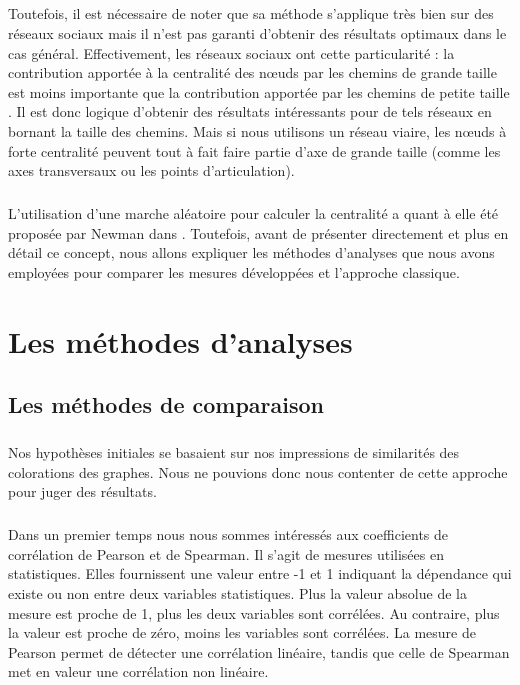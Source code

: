 \documentclass[a4paper, 10pt]{report}
\begin{document}
\paragraph{}Toutefois, il est nécessaire de noter que sa méthode s'applique très bien sur des réseaux sociaux mais il n'est pas garanti d'obtenir des résultats optimaux dans le cas général. Effectivement, les réseaux sociaux ont cette particularité : la contribution apportée à la centralité des n\oe uds par les chemins de grande taille est moins importante que la contribution apportée par les chemins de petite taille \cite{Friedkin1983Horizons, Alahakoon2011KPath}. Il est donc logique d'obtenir des résultats intéressants pour de tels réseaux en bornant la taille des chemins. Mais si nous utilisons un réseau viaire, les n\oe uds à forte centralité peuvent tout à fait faire partie d'axe de grande taille (comme les axes transversaux ou les points d'articulation).

\paragraph{}L'utilisation d'une marche aléatoire pour calculer la centralité a quant à elle été proposée par Newman dans \cite{Newman2005MeasureBetweenness}. Toutefois, avant de présenter directement et plus en détail ce concept, nous allons expliquer les méthodes d'analyses que nous avons employées pour comparer les mesures développées et l'approche classique.


\chapter{Les méthodes d'analyses}

	\section{Les méthodes de comparaison}
	
\paragraph{}Nos hypothèses initiales se basaient sur nos impressions de similarités des colorations des graphes. Nous ne pouvions donc nous contenter de cette approche pour juger des résultats.

\paragraph{}Dans un premier temps nous nous sommes intéressés aux coefficients de corrélation de Pearson et de Spearman. Il s'agit de mesures utilisées en statistiques. Elles fournissent une valeur entre -1 et 1 indiquant la dépendance qui existe ou non entre deux variables statistiques. Plus la valeur absolue de la mesure est proche de 1, plus les deux variables sont corrélées. Au contraire,  plus la valeur est proche de zéro, moins les variables sont corrélées. La mesure de Pearson permet de détecter une corrélation linéaire, tandis que celle de Spearman met en valeur une corrélation non linéaire.
\end{document}

